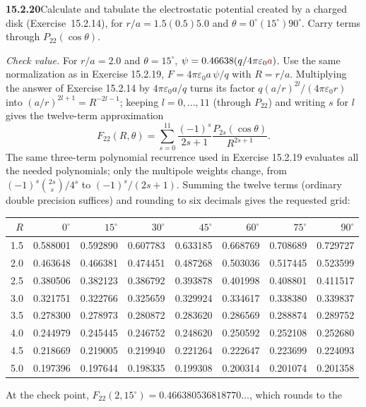 \par\bigskip
\noindent\textbf{15.2.20}\quad Calculate and tabulate the electrostatic
potential created by a charged disk (Exercise~15.2.14), for
$r/a=1.5(0.5)5.0$ and $\theta=0^{\circ}(15^{\circ})90^{\circ}$. Carry
terms through $P_{22}(\cos\theta)$.
\par\nobreak\hfill\emph{Check value.}\enspace
For $r/a=2.0$ and $\theta=15^{\circ}$,
$\psi=0.46638(q/4\pi\varepsilon_{0}\erratum{a})$.
\solution
Use the same normalization as in Exercise 15.2.19,
$F=4\pi\varepsilon_0a\,\psi/q$ with $R=r/a$. Multiplying the answer of
Exercise 15.2.14 by $4\pi\varepsilon_0a/q$ turns its factor
$q(a/r)^{2l}/(4\pi\varepsilon_0r)$ into $(a/r)^{2l+1}=R^{-2l-1}$;
keeping $l=0,\ldots,11$ (through $P_{22}$) and writing $s$ for $l$
gives the twelve-term approximation
\[
F_{22}(R,\theta)=\sum_{s=0}^{11}
\frac{(-1)^s}{2s+1}\frac{P_{2s}(\cos\theta)}{R^{2s+1}}.
\]
The same three-term polynomial recurrence used in Exercise 15.2.19
evaluates all the needed polynomials; only the multipole weights change,
from $(-1)^s\binom{2s}{s}/4^s$ to $(-1)^s/(2s+1)$. Summing the twelve
terms (ordinary double precision suffices) and rounding to six decimals
gives the requested grid:
\begin{center}\small
\setlength{\tabcolsep}{4pt}
\begin{tabular}{r|rrrrrrr}\toprule
$R$&$0^\circ$&$15^\circ$&$30^\circ$&$45^\circ$&$60^\circ$&$75^\circ$&$90^\circ$\\\midrule
1.5&0.588001&0.592890&0.607783&0.633185&0.668769&0.708689&0.729727\\
2.0&0.463648&0.466381&0.474451&0.487268&0.503036&0.517445&0.523599\\
2.5&0.380506&0.382123&0.386792&0.393878&0.401998&0.408801&0.411517\\
3.0&0.321751&0.322766&0.325659&0.329924&0.334617&0.338380&0.339837\\
3.5&0.278300&0.278973&0.280872&0.283620&0.286569&0.288874&0.289752\\
4.0&0.244979&0.245445&0.246752&0.248620&0.250592&0.252108&0.252680\\
4.5&0.218669&0.219005&0.219940&0.221264&0.222647&0.223699&0.224093\\
5.0&0.197396&0.197644&0.198335&0.199308&0.200314&0.201074&0.201358\\
\bottomrule\end{tabular}\end{center}
At the check point,
$F_{22}(2,15^\circ)=0.466380536818770\ldots$, which rounds to the

